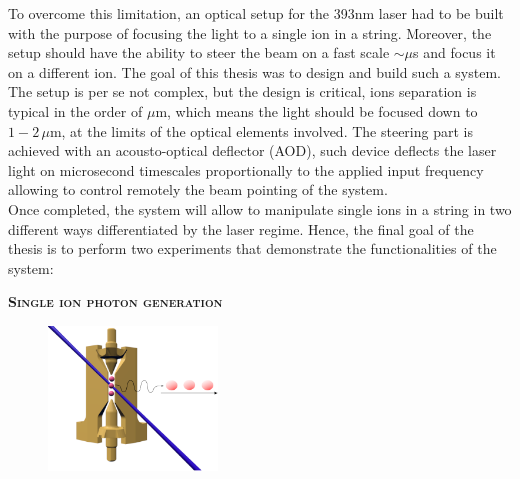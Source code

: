 \documentclass[english, a4paper, 12pt, twoside]{book}
\numberwithin{equation}{section} %
\begin{document}
To overcome this limitation, an optical setup for the 393nm laser had to be built with the purpose of focusing the light to a single ion in a string. Moreover, the setup should have the ability to steer the beam on a fast scale $\sim\mu$s and focus it on a different ion. The goal of this thesis was to design and build such a system. The setup is per se not complex, but the design is critical, ions separation is typical in the order of $\mu$m, which means the light should be focused down to $1-2\,\mu$m, at the limits of the optical elements involved. The steering part is achieved with an acousto-optical deflector (AOD), such device deflects the laser light on microsecond timescales proportionally to the applied input frequency allowing to control remotely the beam pointing of the system.\\
Once completed, the system will allow to manipulate single ions in a string in two different ways differentiated by the laser regime. Hence, the final goal of the thesis is to perform two experiments that demonstrate the functionalities of the system:\vspace{-1em}\newline
\begin{center}{\large\textbf{\textsc{Single ion photon generation}}}\end{center}
\begin{figure}
  \begin{center}
    \includegraphics[width=0.4\textwidth]{photongeneration2}
  \end{center}
\end{figure}
\end{document}

